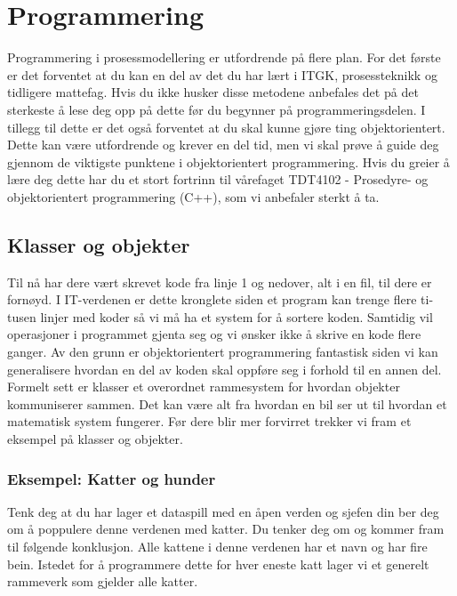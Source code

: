 \clearpage
\section{Programmering}\label{sec:prog}
Programmering i prosessmodellering er utfordrende på flere plan. For det første er det forventet at du kan en del av det du har lært i ITGK, prosessteknikk og tidligere mattefag. Hvis du ikke husker disse metodene anbefales det på det sterkeste å lese deg opp på dette før du begynner på programmeringsdelen. I tillegg til dette er det også forventet at du skal kunne gjøre ting objektorientert. Dette kan være utfordrende og krever en del tid, men vi skal prøve å guide deg gjennom de viktigste punktene i objektorientert programmering. Hvis du greier å lære deg dette har du et stort fortrinn til vårefaget TDT4102 - Prosedyre- og objektorientert programmering (C++), som vi anbefaler sterkt å ta.

\subsection{Klasser og objekter}
Til nå har dere vært skrevet kode fra linje 1 og nedover, alt i en fil, til dere er fornøyd. I IT-verdenen er dette kronglete siden et program kan trenge flere ti-tusen linjer med koder så vi må ha et system for å sortere koden. Samtidig vil operasjoner i programmet gjenta seg og vi ønsker ikke å skrive en kode flere ganger. Av den grunn er objektorientert programmering fantastisk siden vi kan generalisere hvordan en del av koden skal oppføre seg i forhold til en annen del. Formelt sett er klasser et overordnet rammesystem for hvordan objekter kommuniserer sammen. Det kan være alt fra hvordan en bil ser ut til hvordan et matematisk system fungerer. Før dere blir mer forvirret trekker vi fram et eksempel på klasser og objekter.

\subsubsection{Eksempel: Katter og hunder}
Tenk deg at du har lager et dataspill med en åpen verden og sjefen din ber deg om å poppulere denne verdenen med katter. Du tenker deg om og kommer fram til følgende konklusjon. Alle kattene i denne verdenen har et navn og har fire bein. Istedet for å programmere dette for hver eneste katt lager vi et generelt rammeverk som gjelder alle katter.

